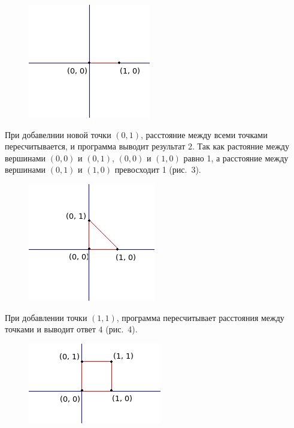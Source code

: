 \begin{figure}[ht!]
\begin{center}
\includegraphics[scale=1.0]{images/picture2.png}
\end{center}
\end{figure}
\newpage
При добавелнии новой точки $(0, 1)$, расстояние между всеми точками пересчитывается, и программа выводит результат 2. Так как растояние между вершинами $(0, 0)$ и $(0, 1)$, $(0, 0)$ и $(1, 0)$ равно 1, а расстояние между вершинами $(0, 1)$ и $(1, 0)$ превосходит 1 (рис.~3).

\begin{figure}[ht!]
\begin{center}
\includegraphics[scale=1.0]{images/picture3.png}
\end{center}
\end{figure}


При добавлении точки $(1, 1)$, программа пересчитывает расстояния между точками и выводит ответ $4$ (рис.~4).

\begin{figure}[ht!]
\begin{center}
\includegraphics[scale=1.0]{images/picture4.png}
\end{center}
\end{figure}

